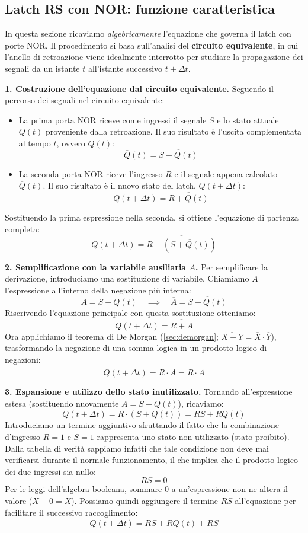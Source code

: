 \subsection{Latch RS con NOR: funzione caratteristica}

\noindent In questa sezione ricaviamo \emph{algebricamente} l'equazione che governa il latch con porte NOR.
Il procedimento si basa sull'analisi del \textbf{circuito equivalente}, in cui l'anello di retroazione viene idealmente interrotto per studiare la propagazione dei segnali da un istante $t$ all'istante successivo $t+\Delta t$.

\medskip
\noindent\textbf{1. Costruzione dell'equazione dal circuito equivalente.}
Seguendo il percorso dei segnali nel circuito equivalente:
\begin{itemize}[leftmargin=1.5em]
    \item La prima porta NOR riceve come ingressi il segnale $S$ e lo stato attuale $Q(t)$ proveniente dalla retroazione. Il suo risultato è l'uscita complementata al tempo $t$, ovvero $\overline{Q}(t)$:
    \[ \overline{Q}(t) = \overline{S + Q(t)} \]
    \item La seconda porta NOR riceve l'ingresso $R$ e il segnale appena calcolato $\overline{Q}(t)$. Il suo risultato è il nuovo stato del latch, $Q(t+\Delta t)$:
    \[ Q(t+\Delta t) = \overline{ R + \overline{Q}(t) } \]
\end{itemize}
Sostituendo la prima espressione nella seconda, si ottiene l'equazione di partenza completa:
\[
Q(t+\Delta t) = \overline{ R + (\overline{S + Q(t)}) }
\]

\medskip
\noindent\textbf{2. Semplificazione con la variabile ausiliaria $A$.}
Per semplificare la derivazione, introduciamo una sostituzione di variabile. Chiamiamo $A$ l'espressione all'interno della negazione più interna:
\[
A = S + Q(t) \quad \implies \quad \overline{A} = \overline{S + Q(t)}
\]
Riscrivendo l'equazione principale con questa sostituzione otteniamo:
\[
Q(t+\Delta t) = \overline{ R + \overline{A} }
\]
Ora applichiamo il teorema di De Morgan (\cref{sec:demorgan}; $\overline{X + Y} = \overline{X} \cdot \overline{Y}$), trasformando la negazione di una somma logica in un prodotto logico di negazioni:
\[
Q(t+\Delta t) = \overline{R} \cdot \overline{\overline{A}} = \overline{R} \cdot A
\]

\medskip
\noindent\textbf{3. Espansione e utilizzo dello stato inutilizzato.}
Tornando all'espressione estesa (sostituendo nuovamente $A = S + Q(t)$), ricaviamo:
\[
Q(t+\Delta t) = \overline{R} \cdot (S + Q(t)) = \overline{R}S + \overline{R}Q(t)
\]
Introduciamo un termine aggiuntivo sfruttando il fatto che la combinazione d'ingresso $R=1$ e $S=1$ rappresenta uno stato non utilizzato (stato proibito).
Dalla tabella di verità sappiamo infatti che tale condizione non deve mai verificarsi durante il normale funzionamento, il che implica che il prodotto logico dei due ingressi sia nullo:
\[
RS = 0
\]
Per le leggi dell'algebra booleana, sommare $0$ a un'espressione non ne altera il valore ($X+0=X$). Possiamo quindi aggiungere il termine $RS$ all'equazione per facilitare il successivo raccoglimento:
\[
Q(t+\Delta t) = \overline{R}S + \overline{R}Q(t) + RS
\]

